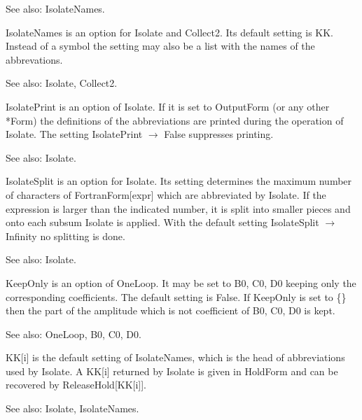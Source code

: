 See also:  IsolateNames.



IsolateNames is an option for Isolate and Collect2. Its default setting is KK. Instead of a symbol the setting may also be a list with
  the names of the abbrevations.

See also:  Isolate, Collect2.



IsolatePrint is an option of Isolate. If it is set to OutputForm (or any other *Form) the definitions of the abbreviations are printed
  during the operation of Isolate. The setting IsolatePrint \(\rightarrow \) False suppresses printing.

See also:  Isolate.



IsolateSplit is an option for Isolate. Its setting determines the maximum number of characters of FortranForm[expr] which are abbreviated
  by Isolate. If the expression is larger than the indicated number, it is split into smaller pieces and onto each subsum Isolate is
  applied. With the default setting IsolateSplit \(\rightarrow \) Infinity no splitting is done.

See also:  Isolate.



KeepOnly is an option of OneLoop. It may be set to B0, C0, D0 keeping only the corresponding coefficients. The default setting is False.
  If KeepOnly is set to \{\} then the part of the amplitude which is not coefficient of B0, C0, D0 is kept.

See also:  OneLoop, B0, C0, D0.



KK[i] is the default setting of IsolateNames, which is the head of abbreviations used by Isolate. A KK[i] returned by Isolate is given in
  HoldForm and can be recovered by ReleaseHold[KK[i]].

See also:  Isolate, IsolateNames.



